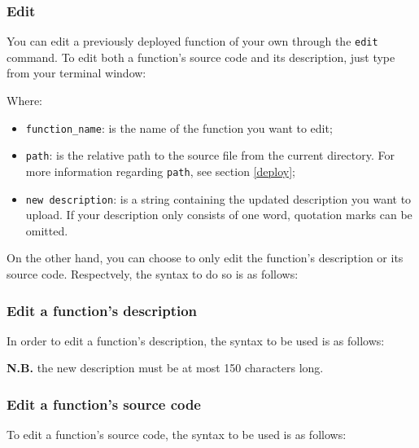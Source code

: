 \subsubsection{Edit}
You can edit a previously deployed function of your own through the \texttt{edit} command. To edit both a function's source code and its description, just type from your terminal window:
\begin{center}
\end{center}
Where:
\begin{itemize}
\item \texttt{function\_name}: is the name of the function you want to edit;
\item \texttt{path}: is the relative path to the source file from the current directory. For more information regarding \texttt{path}, see section \ref{deploy};
\item \texttt{new description}: is a string containing the updated description you want to upload. If your description only consists of one word, quotation marks can be omitted.
 \end{itemize}

On the other hand, you can choose to only edit the function's description or its source code. Respectvely, the syntax to do so is as follows:
\begin{center}
\end{center}
\subsubsection{Edit a function's description}
In order to edit a function's description, the syntax to be used is as follows:
\begin{center}
\end{center}
\textbf{N.B.} the new description must be at most 150 characters long. \\

\subsubsection{Edit a function's source code}
To edit a function's source code, the syntax to be used is as follows:
\begin{center}
\end{center}

